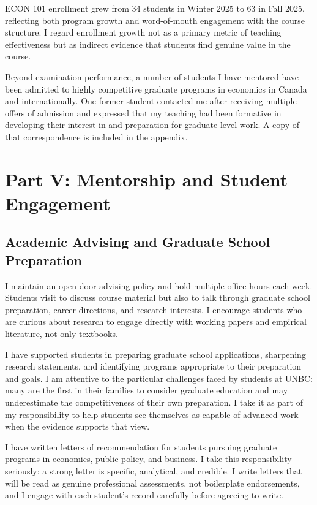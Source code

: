 \documentclass[11pt,letterpaper]{article}
\begin{document}
ECON 101 enrollment grew from 34 students in Winter 2025 to 63 in Fall 2025, reflecting both program growth and word-of-mouth engagement with the course structure. I regard enrollment growth not as a primary metric of teaching effectiveness but as indirect evidence that students find genuine value in the course.

Beyond examination performance, a number of students I have mentored have been admitted to highly competitive graduate programs in economics in Canada and internationally. One former student contacted me after receiving multiple offers of admission and expressed that my teaching had been formative in developing their interest in and preparation for graduate-level work. A copy of that correspondence is included in the appendix.

\section{Part V: Mentorship and Student Engagement}

\subsection{Academic Advising and Graduate School Preparation}

I maintain an open-door advising policy and hold multiple office hours each week. Students visit to discuss course material but also to talk through graduate school preparation, career directions, and research interests. I encourage students who are curious about research to engage directly with working papers and empirical literature, not only textbooks.

I have supported students in preparing graduate school applications, sharpening research statements, and identifying programs appropriate to their preparation and goals. I am attentive to the particular challenges faced by students at UNBC: many are the first in their families to consider graduate education and may underestimate the competitiveness of their own preparation. I take it as part of my responsibility to help students see themselves as capable of advanced work when the evidence supports that view.

I have written letters of recommendation for students pursuing graduate programs in economics, public policy, and business. I take this responsibility seriously: a strong letter is specific, analytical, and credible. I write letters that will be read as genuine professional assessments, not boilerplate endorsements, and I engage with each student's record carefully before agreeing to write.
\end{document}
